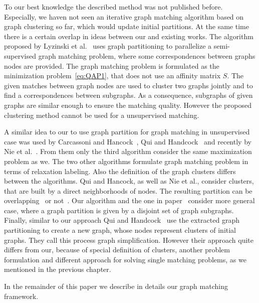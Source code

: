 To our best knowledge the described method was not published before. Especially, we haven not seen an iterative graph matching algorithm based on graph clustering so far, which would update initial partitions. At the same time there is a certain overlap in ideas between our and existing works. The algorithm proposed by Lyzinski et al.~\cite{Lyzinski2015} uses graph partitioning to parallelize a semi-supervised graph matching problem, where some correspondences between graphs nodes are provided. The graph matching problem is formulated as the minimization problem~\eqref{eq:QAP1}, that does not use an affinity matrix $S$. The given matches between graph nodes are used to cluster two graphs jointly and to find a correspondences between subgraphs. As a consequence, subgraphs of given graphs are similar enough to ensure the matching quality. However the proposed clustering method cannot be used for a unsupervised matching.

A similar idea to our to use graph partition for graph matching in unsupervised case was used by Carcassoni and Hancock~\cite{Hancock_ModalClusters}, Qui and Handcock~\cite{Hancock_GM_SpectralPart} and recently by Nie et al.~\cite{CliqueGraph_CVPR2015}. From them only the third algorithm consider the same maximization problem as we. The two other algorithms formulate graph matching problem in terms of relaxation labeling. Also the definition of the graph clusters differs between the algorithms. Qui and Hancock, as well as Nie et al., consider clusters, that are built by a direct neighborhoods of nodes. The resulting partition can be overlapping~\cite{CliqueGraph_CVPR2015} or not~\cite{Hancock_GM_SpectralPart}. Our algorithm and the one in paper~\cite{Hancock_ModalClusters} consider more general case, where a graph partition is given by a disjoint set of graph subgraphs.
Finally, similar to our approach Qui and Handcock~\cite{Hancock_GM_SpectralPart} use the extracted graph partitioning to create a new graph, whose nodes represent clusters of initial graphs. They call this process graph simplification. However their approach quite differs from our, because of special definition of clusters, another problem formulation and different approach for solving single matching problems, as we mentioned in the previous chapter.

In the remainder of this paper we describe in details our graph matching framework.


